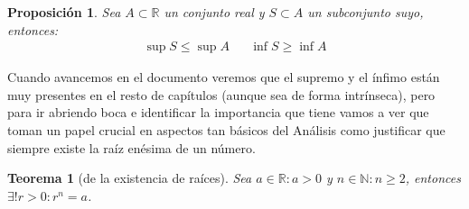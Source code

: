 \documentclass[10pt,a4paper,openright]{book}
\theoremstyle{break}
\newtheorem{theo}{Teorema}[chapter]
\newtheorem{prop}{Proposición}[chapter]
\begin{document}
\begin{prop}
	Sea $A\subset \mathbb{R}$ un conjunto real y $S\subset A$ un subconjunto suyo, entonces:
	\begin{align*}
	\sup S\leq \sup A && \inf S\geq \inf A
	\end{align*}
\end{prop}

Cuando avancemos en el documento veremos que el supremo y el ínfimo están muy presentes en el resto de capítulos (aunque sea de forma intrínseca), pero para ir abriendo boca e identificar la importancia que tiene vamos a ver que toman un papel crucial en aspectos tan básicos del Análisis como justificar que siempre existe la raíz enésima de un número.

\begin{theo}[de la existencia de raíces]
Sea $a\in \mathbb R: a>0$ y $n\in \mathbb N: n\geq 2$, entonces $\exists! r>0: r^n=a$.
\end{theo}
\end{document}
